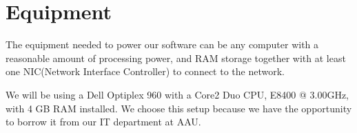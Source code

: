 \section{Equipment}
\label{sec:equipment}
The equipment needed to power our software can be any computer with a reasonable amount of processing power, and RAM storage together with at least one NIC(Network Interface Controller) to connect to the network.

We will be using a Dell Optiplex 960 with a Core2 Duo CPU, E8400 @ 3.00GHz, with 4 GB RAM installed.
We choose this setup because we have the opportunity to borrow it from our IT department at AAU.